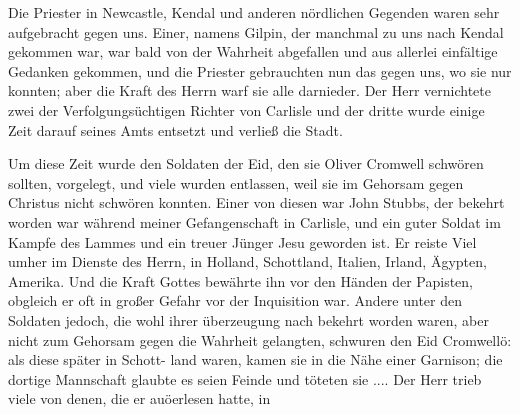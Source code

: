 Die Priester in Newcastle, Kendal und anderen nördlichen
Gegenden waren sehr aufgebracht gegen uns. Einer, namens
Gilpin, der manchmal zu uns nach Kendal gekommen war, war
bald von der Wahrheit abgefallen und aus allerlei einfältige
Gedanken gekommen, und die Priester gebrauchten nun das gegen
uns, wo sie nur konnten; aber die Kraft des Herrn warf sie
alle darnieder. Der Herr vernichtete zwei der Verfolgungsüchtigen
Richter von Carlisle und der dritte wurde einige Zeit darauf
seines Amts entsetzt und verließ die Stadt.


Um diese Zeit wurde den Soldaten der Eid, den sie Oliver
Cromwell schwören sollten, 
vorgelegt, und viele wurden entlassen,
weil sie im Gehorsam gegen Christus nicht schwören konnten.
Einer von diesen war John Stubbs, 
der bekehrt worden war
während meiner Gefangenschaft in Carlisle, und ein guter Soldat
im Kampfe des Lammes und ein treuer Jünger Jesu geworden
ist. Er reiste Viel umher im Dienste des Herrn, in Holland,
Schottland, Italien, 
Irland, Ägypten, 
Amerika. Und die Kraft
Gottes bewährte ihn vor den Händen der 
Papisten, obgleich er
oft in großer Gefahr vor der Inquisition war. Andere unter
den Soldaten jedoch, die wohl ihrer überzeugung nach bekehrt
worden waren, aber nicht zum Gehorsam gegen die Wahrheit
gelangten, schwuren den Eid Cromwellö: als diese später in Schott-
land waren, kamen sie in die Nähe einer Garnison; die dortige
Mannschaft glaubte es seien Feinde und töteten sie ....
Der Herr trieb viele von denen, die er auöerlesen hatte, in


